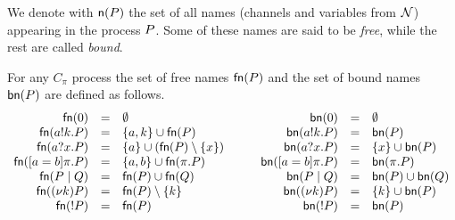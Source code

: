 We denote with $\mathsf{n}(P)$ the set of all names (channels and variables from ${\cal N}$) appearing in the process $P$. 
Some of these names are said to be \emph{free}, while the rest are called \emph{bound}. 

\begin{definition}\label{def:Cpi_bound_names}
For any $C_\pi$ process the set of free names $\mathsf{fn}(P)$ and the set of bound names $\mathsf{bn}(P)$ are defined  as follows.
\[
\begin{array}{rcl}
\mathsf{fn}(0) & = & \emptyset\\
\mathsf{fn}(a!k.P) & = & \{a, k\} \cup \mathsf{fn}(P)\\
\mathsf{fn}(a?x.P) & = & \{a\} \cup (\mathsf{fn}(P)\setminus\{x\})\\
\mathsf{fn}([ a = b ]\pi.P) & = &  \{a, b\} \cup \mathsf{fn}(\pi.P)\\
\mathsf{fn}(P \;|\;Q) & = & \mathsf{fn}(P) \cup \mathsf{fn}(Q)\\
\mathsf{fn}((\nu k)P) & = & \mathsf{fn}(P)\setminus \{k\}\\
\mathsf{fn}(! P) & = & \mathsf{fn}(P)
\end{array}
\qquad
\begin{array}{rcl}
\mathsf{bn}(0) & = & \emptyset\\
\mathsf{bn}(a!k.P) & = & \mathsf{bn}(P)\\
\mathsf{bn}(a?x.P) & = & \{x\} \cup \mathsf{bn}(P)\\
\mathsf{bn}([ a = b ]\pi.P) & = &  \mathsf{bn}(\pi.P)\\
\mathsf{bn}(P \;|\;Q) & = & \mathsf{bn}(P) \cup \mathsf{bn}(Q)\\
\mathsf{bn}((\nu k)P) & = & \{k\} \cup \mathsf{bn}(P)\\
\mathsf{bn}(! P) & = & \mathsf{bn}(P)
\end{array}
\]
\end{definition}

